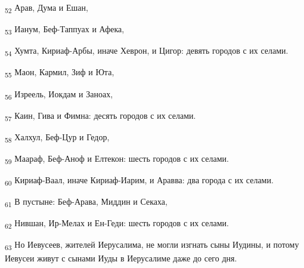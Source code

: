 \begin{tcolorbox}
\textsubscript{52} Арав, Дума и Ешан,
\end{tcolorbox}
\begin{tcolorbox}
\textsubscript{53} Ианум, Беф-Таппуах и Афека,
\end{tcolorbox}
\begin{tcolorbox}
\textsubscript{54} Хумта, Кириаф-Арбы, иначе Хеврон, и Цигор: девять городов с их селами.
\end{tcolorbox}
\begin{tcolorbox}
\textsubscript{55} Маон, Кармил, Зиф и Юта,
\end{tcolorbox}
\begin{tcolorbox}
\textsubscript{56} Изреель, Иокдам и Заноах,
\end{tcolorbox}
\begin{tcolorbox}
\textsubscript{57} Каин, Гива и Фимна: десять городов с их селами.
\end{tcolorbox}
\begin{tcolorbox}
\textsubscript{58} Халхул, Беф-Цур и Гедор,
\end{tcolorbox}
\begin{tcolorbox}
\textsubscript{59} Маараф, Беф-Аноф и Елтекон: шесть городов с их селами.
\end{tcolorbox}
\begin{tcolorbox}
\textsubscript{60} Кириаф-Ваал, иначе Кириаф-Иарим, и Аравва: два города с их селами.
\end{tcolorbox}
\begin{tcolorbox}
\textsubscript{61} В пустыне: Беф-Арава, Миддин и Секаха,
\end{tcolorbox}
\begin{tcolorbox}
\textsubscript{62} Нившан, Ир-Мелах и Ен-Геди: шесть городов с их селами.
\end{tcolorbox}
\begin{tcolorbox}
\textsubscript{63} Но Иевусеев, жителей Иерусалима, не могли изгнать сыны Иудины, и потому Иевусеи живут с сынами Иуды в Иерусалиме даже до сего дня.
\end{tcolorbox}

